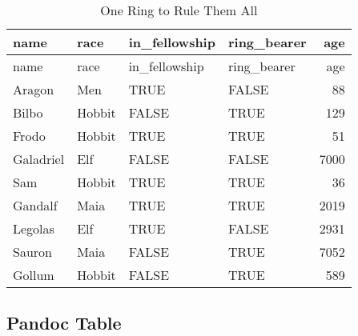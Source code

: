\documentclass[
]{article}
\begin{document}
\begin{longtable}[]{@{}llllr@{}}
\caption{One Ring to Rule Them All}\tabularnewline
\toprule
name & race & in\_fellowship & ring\_bearer & age\tabularnewline
\midrule
\endfirsthead
\toprule
name & race & in\_fellowship & ring\_bearer & age\tabularnewline
\midrule
\endhead
Aragon & Men & TRUE & FALSE & 88\tabularnewline
Bilbo & Hobbit & FALSE & TRUE & 129\tabularnewline
Frodo & Hobbit & TRUE & TRUE & 51\tabularnewline
Galadriel & Elf & FALSE & FALSE & 7000\tabularnewline
Sam & Hobbit & TRUE & TRUE & 36\tabularnewline
Gandalf & Maia & TRUE & TRUE & 2019\tabularnewline
Legolas & Elf & TRUE & FALSE & 2931\tabularnewline
Sauron & Maia & FALSE & TRUE & 7052\tabularnewline
Gollum & Hobbit & FALSE & TRUE & 589\tabularnewline
\bottomrule
\end{longtable}

\hypertarget{pandoc-table}{%
\subsection{Pandoc Table}\label{pandoc-table}}
\end{document}
